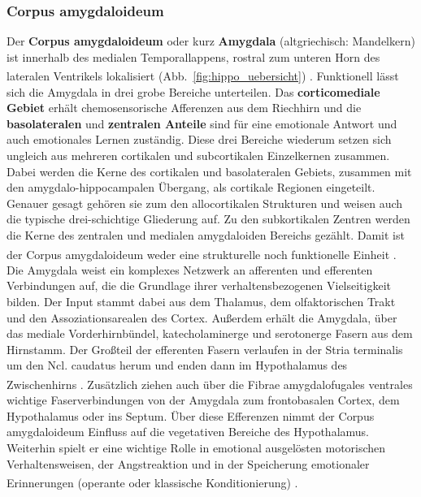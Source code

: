 \subsubsection*{Corpus amygdaloideum}  
Der \textbf{Corpus amygdaloideum} oder kurz \textbf{Amygdala} (altgriechisch: Mandelkern) ist innerhalb des medialen Temporallappens, rostral zum unteren Horn des lateralen Ventrikels lokalisiert (Abb.~\ref{fig:hippo_uebersicht}) \textsuperscript{\cite[Kap.~9]{trepel2011neuroanatomie}}. Funktionell lässt sich die Amygdala in drei grobe Bereiche unterteilen. Das \textbf{corticomediale Gebiet} erhält chemosensorische Afferenzen aus dem Riechhirn und die \textbf{basolateralen} und \textbf{zentralen Anteile} sind für eine emotionale Antwort und auch emotionales Lernen zuständig. Diese drei Bereiche wiederum setzen sich ungleich aus mehreren cortikalen und subcortikalen Einzelkernen zusammen. Dabei werden die Kerne des cortikalen und basolateralen Gebiets, zusammen mit den amygdalo-hippocampalen Übergang, als cortikale Regionen eingeteilt. Genauer gesagt gehören sie zum den allocortikalen Strukturen und weisen auch die typische drei-schichtige Gliederung auf. Zu den subkortikalen Zentren werden die Kerne des zentralen und medialen amygdaloiden Bereichs gezählt. Damit ist der Corpus amygdaloideum weder eine strukturelle noch funktionelle Einheit \textsuperscript{\cite[Kap.~18]{paxinos2014rat}}. \\
Die Amygdala weist ein komplexes Netzwerk an afferenten und efferenten Verbindungen auf, die die Grundlage ihrer verhaltensbezogenen Vielseitigkeit bilden. Der Input stammt dabei aus dem Thalamus, dem olfaktorischen Trakt und den Assoziationsarealen des Cortex. Außerdem erhält die Amygdala, über das mediale Vorderhirnbündel, katecholaminerge und serotonerge Fasern aus dem Hirnstamm. 
Der Großteil der efferenten Fasern verlaufen in der Stria terminalis um den Ncl. caudatus herum und enden dann im Hypothalamus des Zwischenhirns \textsuperscript{\cite[Kap.~12]{crossman2014neuroanatomy}}. Zusätzlich ziehen auch über die Fibrae amygdalofugales ventrales wichtige Faserverbindungen von der Amygdala zum frontobasalen Cortex, dem Hypothalamus oder ins Septum. Über diese Efferenzen nimmt der Corpus amygdaloideum Einfluss auf die vegetativen Bereiche des Hypothalamus. Weiterhin spielt er eine wichtige Rolle in emotional ausgelösten motorischen Verhaltensweisen, der Angstreaktion und in der Speicherung emotionaler Erinnerungen (operante oder klassische Konditionierung) \textsuperscript{\cite[Kap.~9]{trepel2011neuroanatomie}}. 

